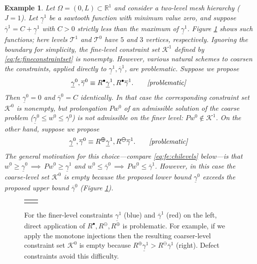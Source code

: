 \documentclass[letterpaper,final,12pt,reqno]{amsart}
\theoremstyle{cstyle}
\theoremstyle{cstyle*}
\theoremstyle{dstyle}
\newtheorem{example}[theorem]{Example}
\numberwithin{equation}{section}
\numberwithin{figure}{section}
\numberwithin{table}{section}
\numberwithin{theorem}{section}
\newcommand{\RR}{\mathbb{R}}
\newcommand{\maxR}{R^{\bm{\oplus}}}
\newcommand{\minR}{R^{\bm{\ominus}}}
\newcommand{\iR}{R^{\bullet}}
\begin{document}
\begin{example}  \label{ex:directRbad}  
Let $\Omega = (0,L) \subset \RR^1$ and consider a two-level mesh hierarchy ($J=1$).  Let $\underline{\gamma}^1$ be a sawtooth function with minimum value zero, and suppose $\overline{\gamma}^1=C+\underline{\gamma}^1$ with $C>0$ strictly less than the maximum of $\underline{\gamma}^1$.  Figure \ref{fig:directRbad} shows such functions; here levels $\mathcal{T}^1$ and $\mathcal{T}^0$ have $5$ and $3$ vertices, respectively.  Ignoring the boundary for simplicity, the fine-level constraint set $\mathcal{K}^1$ defined by \eqref{eq:fe:fineconstraintset} is nonempty.  However, various natural schemes to coarsen the constraints, applied directly to $\underline{\gamma}^1,\overline{\gamma}^1$, are problematic.  Suppose we propose
\begin{equation}
    \label{eq:fe:standardinjection}
    \underline{\gamma}^0, \overline{\gamma}^0 \equiv \iR \underline{\gamma}^1, \iR \overline{\gamma}^1. \qquad \text{\emph{[problematic]}}
\end{equation}
Then $\underline{\gamma}^0=0$ and $\overline{\gamma}^0=C$ identically.  In that case the corresponding constraint set $\mathcal{K}^0$ is nonempty, but prolongation $Pw^0$ of an admissible solution of the coarse problem ($\underline{\gamma}^0 \le w^0 \le \overline{\gamma}^0$) is not admissible on the finer level: $Pw^0 \notin \mathcal{K}^1$.  On the other hand, suppose we propose
\begin{equation}
    \label{eq:fe:monotoneinjection}
    \underline{\gamma}^0, \overline{\gamma}^0 \equiv \maxR \underline{\gamma}^1, \minR \overline{\gamma}^1. \qquad \text{\emph{[problematic]}}
\end{equation}
The general motivation for this choice---compare \eqref{eq:fe:chilevels} below---is that $w^0 \ge \underline{\gamma}^0 \, \implies \, Pw^0 \ge \underline{\gamma}^1$ and $w^0 \le \overline{\gamma}^0 \, \implies \, Pw^0 \le \overline{\gamma}^1$.  However, in this case the coarse-level set $\mathcal{K}^0$ is empty because the proposed lower bound $\underline{\gamma}^0$ exceeds the proposed upper bound $\overline{\gamma}^0$ (Figure \ref{fig:directRbad}).
\end{example}

\begin{figure}[ht]
\begin{tabular}{cc}

&

\end{tabular}
\caption{For the finer-level constraints $\underline{\gamma}^1$ (blue) and $\overline{\gamma}^1$ (red) on the left, direct application of $\iR,\minR,\maxR$ is problematic.  For example, if we apply the monotone injections then the resulting coarser-level constraint set $\mathcal{K}^0$ is empty because $\maxR \underline{\gamma}^1 > \minR \overline{\gamma}^1$ (right).  Defect constraints avoid this difficulty.}
\label{fig:directRbad}
\end{figure}
\end{document}
